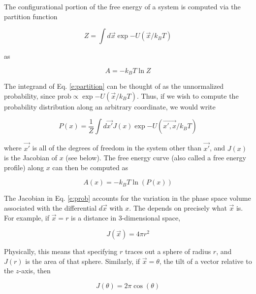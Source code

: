 
\label{s:phys_mean}

The configurational portion of the free energy of a system is computed via the partition function

\begin{equation}
    \label{e:partition}
    Z = \int d\vec{x} \exp{-U(\vec{x}/k_B T)}
\end{equation}

as

\begin{equation}
    A = -k_B T \ln Z
\end{equation}

The integrand of Eq. \ref{e:partition} can be thought of as the unnormalized
probability, since $\mathrm{prob} \propto \exp{-U(\vec{x}/k_B T)}$.  Thus, if we wish to compute the probability distribution along an arbitrary coordinate, we would write

\begin{equation}
    \label{e:prob}
    P(x) = \frac{1}{Z} \int d\vec{x'} J(x) \exp{-U(\vec{x', x}/k_B T)}
\end{equation}

\noindent where $\vec{x'}$ is all of the degrees of freedom in the system other
than $\vec{x'}$, and $J(x)$ is the Jacobian of $x$ (see below).  The free energy curve (also called a free energy profile) along $x$ can then be computed
as

\begin{equation}
    \label{e:free}
    A(x) = - k_B T \ln(P(x))
\end{equation}


The Jacobian in Eq. \ref{e:prob} accounts for the variation in the phase space
volume associated with the differential $d\vec{x}$ with $x$.  The depends on
precisely what $\vec{x}$ is. For example, if $\vec{x} = r $ is a distance in
3-dimensional space,

\begin{equation}
J(\vec{x}) = 4 \pi r^2
\end{equation}

\noindent Physically, this means that specifying $r$ traces out a sphere of
radius $r$, and $J(r)$ is the area of that sphere.  Similarly, if $\vec{x}=
\theta$, the tilt of a vector relative to the $z$-axis, then

\begin{equation}
J(\theta) = 2 \pi \cos(\theta)
\end{equation}

